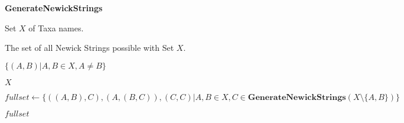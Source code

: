\begin{algorithm}[h]
\caption{ \textbf{GenerateNewickStrings} }
\label{alg:comp_nni_neigh}
\begin{algorithmic}[5]

    \REQUIRE Set $X$ of Taxa names.

    \ENSURE The set of all Newick Strings possible with Set $X$.

    
        \RETURN $\{(A,B)| A,B \in X, A \neq B\}$
    \ENDIF

        \RETURN $X$ 
    \ENDIF

    \STATE $fullset \leftarrow \{((A,B),C),(A,(B,C)),(C,C)| A,B \in X, C \in
                                    \textbf{GenerateNewickStrings}(X \setminus \{A,B\}) \}$


    \RETURN $fullset$

\end{algorithmic}
\end{algorithm}

